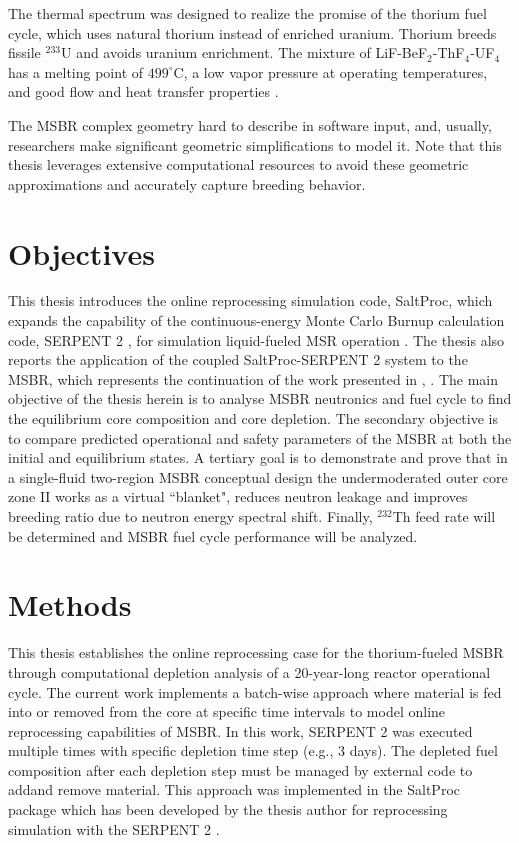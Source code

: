 The thermal spectrum  was designed to realize the promise of the thorium fuel cycle, which uses natural thorium instead of enriched uranium. Thorium breeds fissile $^{233}$U and avoids uranium enrichment. The mixture of LiF-BeF$_2$-ThF$_4$-UF$_4$ has a melting point of $499^\circ$C, a low vapor pressure at operating temperatures, and good flow and heat transfer properties \cite{robertson_conceptual_1971}. 

The \gls{MSBR} complex geometry hard to describe in software input, and, usually, researchers make significant geometric simplifications to model it\cite{park_whole_2015}. Note that this thesis leverages extensive computational resources to avoid these geometric approximations and accurately capture breeding behavior.

\section{Objectives}
This thesis introduces the online reprocessing simulation code, SaltProc, which expands the capability of the continuous-energy Monte Carlo Burnup calculation code, SERPENT 2 \cite{leppanen_serpent_2015}, for simulation liquid-fueled \gls{MSR} operation \cite{andrei_rykhlevskii_arfc/saltproc:_2018}. The thesis also reports the application of the coupled SaltProc-SERPENT 2 system to the \gls{MSBR}, which represents the continuation of the work presented in \cite{rykhlevskii_full-core_2017}, \cite{rykhlevskii_online_2017}. The main objective of the thesis herein is to analyse \gls{MSBR} neutronics and fuel cycle to find the equilibrium core composition and core depletion. The secondary objective is to compare predicted operational and safety parameters of the \gls{MSBR} at both the initial and equilibrium states. A tertiary goal is to demonstrate and prove that in a single-fluid two-region \gls{MSBR} conceptual design the undermoderated outer core zone II works as a virtual ``blanket", reduces neutron leakage and improves breeding ratio due to neutron energy spectral shift. Finally, $^{232}$Th feed rate will be determined and \gls{MSBR} fuel cycle performance will be analyzed.

\section{Methods}
This thesis establishes the online reprocessing case for the thorium-fueled \gls{MSBR} through computational depletion analysis of a 20-year-long reactor operational cycle. The current work implements a batch-wise approach where material is fed into or removed from the core at specific time intervals to model online reprocessing capabilities of \gls{MSBR}. In this work, SERPENT 2 was executed multiple times with specific depletion time step (e.g., 3 days). The depleted fuel composition after each depletion step  must be managed by external code to addand remove material. This approach was implemented in the SaltProc package \cite{andrei_rykhlevskii_arfc/saltproc:_2018} which has been developed by the thesis author for reprocessing simulation with the SERPENT 2 \cite{leppanen_serpent_2015}. 

